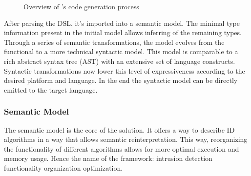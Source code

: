 \documentclass[conference]{IEEEtran}
\begin{document}
\begin{figure}[ht]
  \centering
\caption{Overview of \NAME's code generation process}
\label{fig:code-generation}
\end{figure}

After parsing the DSL, it's imported into a semantic model. The minimal type
information present in the initial model allows inferring of the remaining
types. Through a series of semantic transformations, the model evolves from the
functional to a more technical syntactic model. This model is comparable to a
rich abstract syntax tree (AST) with an extensive set of language constructs.
Syntactic transformations now lower this level of expressiveness according to
the desired platform and language. In the end the syntactic model can be
directly emitted to the target language.

\subsubsection{Semantic Model}

The semantic model is the core of the solution. It offers a way to describe ID
algorithms in a way that allows semantic reinterpretation. This way,
reorganizing the functionality of different algorithms allows for more optimal
execution and memory usage. Hence the name \NAME of the framework: intrusion
detection functionality organization optimization.
\end{document}
